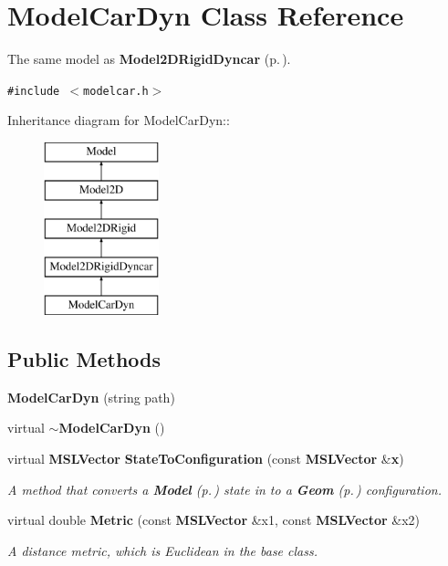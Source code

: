 \section{Model\-Car\-Dyn  Class Reference}
\label{classModelCarDyn}
The same model as {\bf Model2DRigid\-Dyncar} {\rm (p.\,\pageref{classModel2DRigidDyncar})}. 


{\tt \#include $<$modelcar.h$>$}

Inheritance diagram for Model\-Car\-Dyn::\begin{figure}[H]
\begin{center}
\leavevmode
\includegraphics[height=5cm]{classModelCarDyn}
\end{center}
\end{figure}
\subsection*{Public Methods}
\begin{CompactItemize}
\item 
{\bf Model\-Car\-Dyn} (string path)
\item 
virtual {\bf $\sim$Model\-Car\-Dyn} ()
\item 
virtual {\bf MSLVector} {\bf State\-To\-Configuration} (const {\bf MSLVector} \&{\bf x})
\begin{CompactList}\small\item\em A method that converts a {\bf Model} {\rm (p.\,\pageref{classModel})} state in to a {\bf Geom} {\rm (p.\,\pageref{classGeom})} configuration.\item\end{CompactList}\item 
virtual double {\bf Metric} (const {\bf MSLVector} \&x1, const {\bf MSLVector} \&x2)
\begin{CompactList}\small\item\em A distance metric, which is Euclidean in the base class.\item\end{CompactList}\end{CompactItemize}


